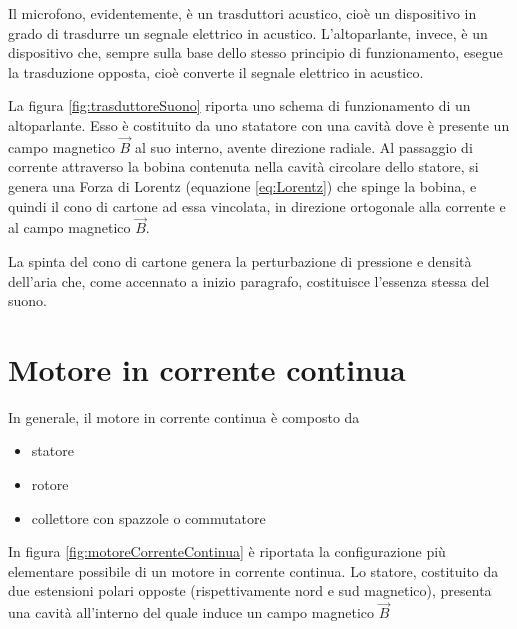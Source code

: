 \documentclass[17pt]{extarticle}
\begin{document}
Il microfono, evidentemente, è un trasduttori acustico, cioè un dispositivo in grado di trasdurre un segnale elettrico in acustico. L'altoparlante, invece, è un dispositivo che, sempre sulla base dello stesso principio di funzionamento, esegue la trasduzione opposta, cioè converte il segnale elettrico in acustico.

La figura \ref{fig:trasduttoreSuono} riporta uno schema di funzionamento di un altoparlante. Esso è costituito da uno statatore con una cavità dove è presente un campo magnetico $\vec{B}$ al suo interno, avente direzione radiale. Al passaggio di corrente attraverso la bobina contenuta nella cavità circolare dello statore, si genera una Forza di Lorentz (equazione \ref{eq:Lorentz}) che spinge la bobina, e quindi il cono di cartone ad essa vincolata, in direzione ortogonale alla corrente e al campo magnetico $\vec{B}$.

La spinta del cono di cartone genera la perturbazione di pressione e densità dell'aria che, come accennato a inizio paragrafo, costituisce l'essenza stessa del suono.
























\clearpage

\section{Motore in corrente continua}


In generale, il motore in corrente continua è composto da
\begin{itemize}
	\item statore
	\item rotore
	\item collettore con spazzole o commutatore
\end{itemize}

In figura \ref{fig:motoreCorrenteContinua} è riportata la configurazione più elementare possibile di un motore in corrente continua. Lo statore, costituito da due estensioni polari opposte (rispettivamente nord e sud magnetico), presenta una cavità all'interno del quale induce un campo magnetico $\vec{B}$ 
\end{document}
